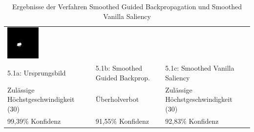 \begin{table}
\begin{tabular}{p{4.5cm}p{4.5cm}p{4.5cm}}
		\includegraphics[width=\linewidth]{Images/AnPe/5_1_Rechts}\\ 
		5.1a: Ursprungsbild &5.1b: Smoothed Guided Backprop. &5.1c: Smoothed Vanilla Saliency \\
		Zulässige Höchstgeschwindigkeit (30) & Überholverbot & Zulässige Höchstgeschwindigkeit (30)\\
		99,39\% Konfidenz & 91,55\% Konfidenz & 92,83\% Konfidenz\\
		
	\end{tabular} 

	\caption{Ergebnisse der Verfahren Smoothed Guided Backpropagation und Smoothed Vanilla Saliency}
	\label{tab:sal1}
\end{table}

